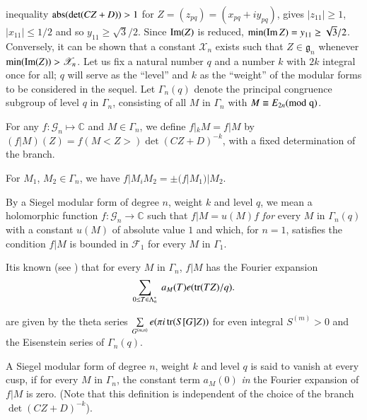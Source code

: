 inequality $\operatorname{abs}(\det (CZ+D))>1$ for $Z=(z_{pq})=(x_{pq}+iy_{pq})$,
gives $|z_{11}|\geq 1$, $|x_{11}|\leq 1/2$ and so $y_{11}\geq
\sqrt{3}/2$. Since $\operatorname{Im}(Z)$ is reduced, $\min(\operatorname{Im} Z)=y_{11}\geq
\sqrt{3}/2$. Conversely, it can be shown that a constant
$\mathscr{X}_{n}$ exists such that $Z\in \mathfrak{g}_{n}$ whenever
$\min(\operatorname{Im}(Z))>\mathscr{X}_{n}$. Let us fix a natural number $q$ and a
number $k$ with $2k$ integral once for all; $q$ will serve as the
``level'' and $k$ as the ``weight'' of the modular forms to be
considered in the sequel. Let $\Gamma_{n}(q)$ denote the principal
congruence subgroup of level $q$ in $\Gamma_{n}$, consisting of all
$M$ in $\Gamma_{n}$ with $M\equiv E_{2n}(\rm{mod} \; q)$.

\begin{defi*}
For any $f:\mathscr{G}_{n}\mapsto \mathbb{C}$ and $M\in\Gamma_{n}$,
we define $f|_{k}M=f|M$ by $(f|M)(Z)=f(M<Z>)\det (CZ+D)^{-k}$, with a
fixed determination of the branch.
\end{defi*}

For $M_{1}$, $M_{2}\in\Gamma_{n}$, we have $f|M_{i}M_{2}=\pm
(f|M_{1})|M_{2}$.

\begin{defi*}
By a Siegel modular form of degree $n$, weight $k$ and level $q$, we
mean a holomorphic function $f:\mathscr{G}_{n}\to \mathbb{C}$ such
that $f|M=u(M)f$ {\em for} every $M$ in $\Gamma_{n}(q)$ with a
constant $u(M)$ of absolute value $1$ and which, for $n=1$, satisfies
the condition $f|M$ is bounded in $\mathcal{F}_{1}$ for every $M$ in
$\Gamma_{1}$.
\end{defi*}

It\pageoriginale is known (see \cite{key16}) that for every $M$ in
$\Gamma_{n}$, $f|M$ has the Fourier expansion 
$$
\sum\limits_{0\leq T\in
  \Lambda^*_{n}} \;  a_{M}(T) e(\operatorname{tr}(TZ)/q).
$$

\begin{examples*}
are given by the theta series $\sum\limits_{G^{(m,n)}}e(\pi
i\operatorname{tr}(S[G]Z))$ for even integral $S^{(m)}>0$ and the Eisenstein series
of $\Gamma_{n}(q)$.
\end{examples*}

\begin{defi*}
A Siegel modular form of degree $n$, weight $k$ and level $q$ is said
to vanish at every cusp, if for every $M$ in $\Gamma_{n}$, the
constant term $a_{M}(0)$ {\em in} the Fourier expansion of $f|M$ is
zero. (Note that this definition is independent of the choice of the
branch $\det (CZ+D)^{-k}$).
\end{defi*}

